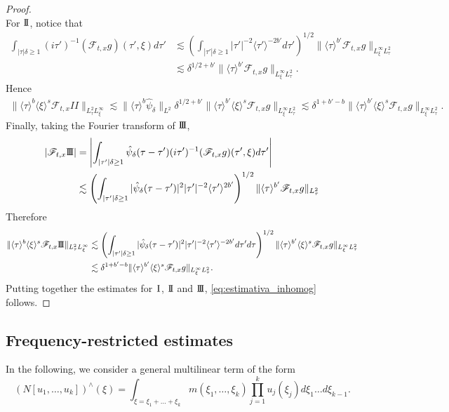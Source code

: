 \documentclass[a4paper, 11pt]{amsart}
\newcommand{\jap}[1]{\langle #1 \rangle}
\theoremstyle{plain}
\theoremstyle{definition}
\theoremstyle{remark}
\newcommand{\I}{\hspace{0.2mm}\textup{I}\hspace{0.2mm}}
\newcommand{\II}{\text{I \hspace{-2.9mm} I} }
\newcommand{\III}{\text{I \hspace{-2.9mm} I \hspace{-2.9mm} I}}
\newcommand{\5}{\text{V}}
\numberwithin{equation}{section}
\theoremstyle{mytheoremstyle} \newtheorem{nota}[thm]{Remark}
\theoremstyle{mytheoremstyle} \newtheorem{exemplo}[thm]{Example}
\begin{document}
\begin{proof}
$$$$
For $\II$, notice that
\begin{align*}
	\int_{|\tau|\delta\ge 1} (i\tau')^{-1}(\mathcal{F}_{t,x}g)(\tau',\xi)d\tau' &\lesssim \left(\int_{|\tau'|\delta\ge 1} |\tau'|^{-2}\jap{\tau'}^{-2b'} d\tau' \right)^{1/2}\|\jap{\tau}^{b'}\mathcal{F}_{t,x}g\|_{L^\infty_\xi L^2_\tau} \\&\lesssim \delta^{1/2 + b'}\|\jap{\tau}^{b'}\mathcal{F}_{t,x}g\|_{L^\infty_\xi L^2_\tau} .
\end{align*}
Hence
\begin{align*}
	\|\jap{\tau}^b\jap{\xi}^s \mathcal{F}_{t,x}II\|_{L^2_\tau L^\infty_\xi} \lesssim \|\jap{\tau}^{b}\hat{\psi}_\delta\|_{L^2}\delta^{1/2 + b'}\|\jap{\tau}^{b'}\jap{\xi}^s\mathcal{F}_{t,x}g\|_{L^\infty_\xi L^2_\tau}\lesssim \delta^{1+b'-b}\|\jap{\tau}^{b'}\jap{\xi}^s \mathcal{F}_{t,x}g\|_{ L^\infty_\xi L^2_\tau}.
\end{align*}
Finally, taking the Fourier transform of $\III$,
\begin{align*}
	|\mathcal{F}_{t,x}\III| &= \left|\int_{|\tau'|\delta\ge 1} \hat{\psi}_\delta(\tau-\tau')(i\tau')^{-1}(\mathcal{F}_{t,x}g)(\tau',\xi)d\tau'\right| \\&\lesssim \left(\int_{|\tau'|\delta\ge 1}|\hat{\psi}_\delta(\tau-\tau')|^2|\tau'|^{-2}\jap{\tau'}^{2b'} \right)^{1/2}\|\jap{\tau}^{b'}\mathcal{F}_{t,x}g\|_{L^2_\tau}
\end{align*}
Therefore
\begin{align*}
	\|\jap{\tau}^b\jap{\xi}^s \mathcal{F}_{t,x}\III\|_{L^2_\tau L^\infty_\xi} &\lesssim \left(\int_{|\tau'|\delta\ge 1}|\hat{\psi}_\delta(\tau-\tau')|^2|\tau'|^{-2}\jap{\tau'}^{-2b'} d\tau'd\tau \right)^{1/2}\|\jap{\tau}^{b'}\jap{\xi}^s\mathcal{F}_{t,x}g\|_{L^\infty_\xi L^2_\tau}\\&\lesssim \delta^{1+b'-b}\|\jap{\tau}^{b'}\jap{\xi}^s \mathcal{F}_{t,x}g\|_{ L^\infty_\xi L^2_\tau}.
\end{align*}
Putting together the estimates for $\I$, $\II$ and $\III$, \eqref{eq:estimativa_inhomog} follows.
\end{proof}



\subsection{Frequency-restricted estimates}


In the following, we consider a general multilinear term of the form
$$
(N[u_1,\dots, u_k])^\wedge(\xi)=\int_{\xi=\xi_1+\dots+\xi_k} m(\xi_1,\dots,\xi_k)\prod_{j=1}^ku_j(\xi_j) d\xi_1\dots d\xi_{k-1}.
$$
\end{document}

